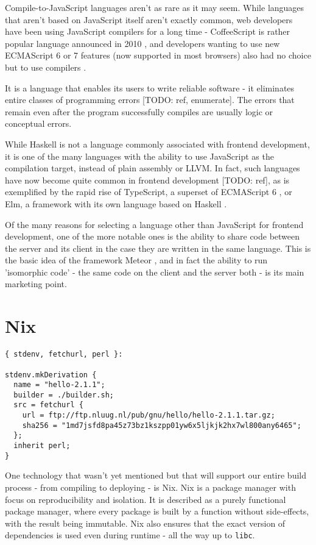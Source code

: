 \documentclass[english,odsaz]{fitthesis}
\begin{document}
Compile-to-JavaScript languages aren't as rare as it may seem. While languages
that aren't based on JavaScript itself aren't exactly common, web developers
have been using JavaScript compilers for a long time - CoffeeScript is rather
popular language announced in 2010 \cite{coffeescript}, and developers wanting to use
new ECMAScript 6 or 7 features (now supported in most browsers) also had no
choice but to use compilers \cite{babel}.

It is a language that enables its users to write reliable software - it
eliminates entire classes of programming errors [TODO: ref, enumerate]. The
errors that remain even after the program successfully compiles are usually
logic or conceptual errors.

While Haskell is not a language commonly associated with frontend development,
it is one of the many languages with the ability to use JavaScript as the
compilation target, instead of plain assembly or LLVM. In fact, such languages
have now become quite common in frontend development [TODO: ref], as is
exemplified by the rapid rise of TypeScript, a superset of ECMAScript 6
\cite{typescript}, or Elm, a framework with its own language based on Haskell
\cite{czaplicki2012elm}.

Of the many reasons for selecting a language other than JavaScript for frontend
development, one of the more notable ones is the ability to share code between
the server and its client in the case they are written in the same
language. This is the basic idea of the framework Meteor \cite{meteor}, and in
fact the ability to run 'isomorphic code' - the same code on the client and the
server both - is its main marketing point.

\section{Nix}
\label{sec:org75fbbde}
\begin{verbatim}
{ stdenv, fetchurl, perl }:

stdenv.mkDerivation {
  name = "hello-2.1.1";
  builder = ./builder.sh;
  src = fetchurl {
    url = ftp://ftp.nluug.nl/pub/gnu/hello/hello-2.1.1.tar.gz;
    sha256 = "1md7jsfd8pa45z73bz1kszpp01yw6x5ljkjk2hx7wl800any6465";
  };
  inherit perl;
}
\end{verbatim}

One technology that wasn't yet mentioned but that will support our entire build
process - from compiling to deploying - is Nix. Nix \cite{dolstra2006purely} is a
package manager with focus on reproducibility and isolation. It is described as
a purely functional package manager, where every package is built by a function
without side-effects, with the result being immutable. Nix also ensures that the
exact version of dependencies is used even during runtime - all the way up to
\texttt{libc}.
\end{document}
